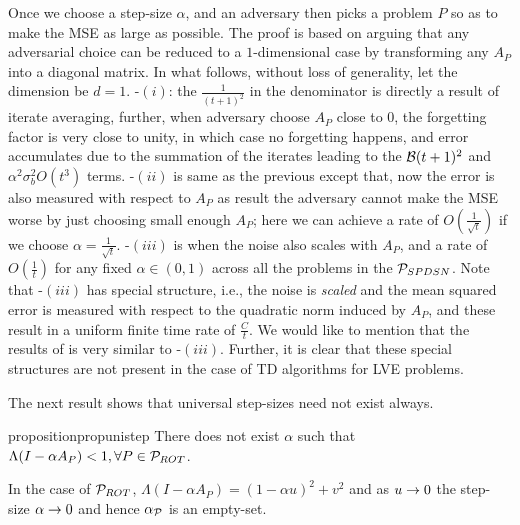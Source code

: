 Once we choose a step-size $\alpha$, and an adversary then picks a problem $P$ so as to make the MSE as large as possible. The proof is based on arguing that any adversarial choice can be reduced to a $1$-dimensional case by transforming any $A_P$ into a diagonal matrix. In what follows, without loss of generality, let the dimension be $d=1$.
-$(i)$: the $\frac{1}{(t+1)^2}$ in the denominator is directly a result of iterate averaging,  further, when adversary choose $A_P$ close to $0$, the forgetting factor is very close to unity, in which case no forgetting happens, and error accumulates due to the summation of the iterates leading to the $\B(t+1)^2$ and $\alpha^2 \sigma_b^2 O(t^3)$ terms. -$(ii)$ is same as the previous except that, now the error is also measured with respect to $A_P$ as result the adversary cannot make the MSE worse by just choosing small enough $A_P$; here we can achieve a rate of $O(\frac{1}{\sqrt{t}})$ if we choose $\alpha=\frac{1}{\sqrt{t}}$. -$(iii)$ is when the noise also scales with $A_P$, and a rate of $O(\frac{1}{t})$ for any fixed $\alpha\in(0,1)$ across all the problems in the $\P_{SPDSN}$. Note that -$(iii)$ has special structure, i.e., the noise is \emph{scaled} and the mean squared error is measured with respect to the quadratic norm induced by $A_P$, and these result in a uniform finite time rate of $\frac{C}{t}$. We would like to mention that the results of \citet{bach} is very similar to  -$(iii)$. Further, it is clear that these special structures are not present in the case of TD algorithms for LVE problems.

The next result shows that universal step-sizes need not exist always.
\begin{restatable}{proposition}{propunistep}\label{prop:unistep}
There does not exist $\alpha$ such that $\Lambda(I-\alpha A_P)<1, \forall P\in \P_{ROT}$. 
\end{restatable}
In the case of $\P_{ROT}$,  $\Lambda(I-\alpha A_P)=(1-\alpha u)^2+v^2$ and as $u\ra 0$ the step-size $\alpha\ra 0$ and hence $\alpha_{\P}$ is an empty-set.


